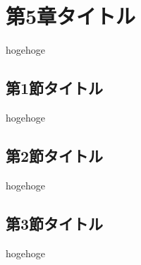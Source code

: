 \chapter{第5章タイトル}
hogehoge

  \section{第1節タイトル}
  hogehoge

  \section{第2節タイトル}
  hogehoge

  \section{第3節タイトル}
  hogehoge
